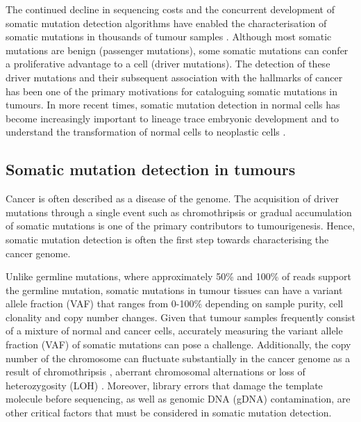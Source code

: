 The continued decline in sequencing costs and the concurrent development of somatic mutation detection algorithms have enabled the characterisation of somatic mutations in thousands of tumour samples \cite{Weinstein2013-ko, ICGCTCGA_Pan-Cancer_Analysis_of_Whole_Genomes_Consortium2020-ts}. Although most somatic mutations are benign (passenger mutations), some somatic mutations can confer a proliferative advantage to a cell (driver mutations). The detection of these driver mutations and their subsequent association with the hallmarks of cancer \cite{Hanahan2000-dp, Hanahan2011-zr} has been one of the primary motivations for cataloguing somatic mutations in tumours. In more recent times, somatic mutation detection in normal cells has become increasingly important to lineage trace embryonic development \cite{Behjati2014-gb} and to understand the transformation of normal cells to neoplastic cells \cite{Martincorena2015-io}. 

\subsection{Somatic mutation detection in tumours}
\label{sec:somatic_mutation_detection_in_tumours}

Cancer is often described as a disease of the genome. The acquisition of driver mutations through a single event such as chromothripsis \cite{Stephens2011-gj} or gradual accumulation of somatic mutations \cite{Doll1954-of, Knudson1971-fg} is one of the primary contributors to tumourigenesis. Hence, somatic mutation detection is often the first step towards characterising the cancer genome. 

Unlike germline mutations, where approximately 50\% and 100\% of reads support the germline mutation, somatic mutations in tumour tissues can have a variant allele fraction (VAF) that ranges from 0-100\% depending on sample purity, cell clonality and copy number changes. Given that tumour samples frequently consist of a mixture of normal and cancer cells, accurately measuring the variant allele fraction (VAF) of somatic mutations can pose a challenge. Additionally, the copy number of the chromosome can fluctuate substantially in the cancer genome as a result of chromothripsis \cite{Stephens2011-gj}, aberrant chromosomal alternations \cite{Albertson2003-lr, Frohling2008-uc} or loss of heterozygosity (LOH) \cite{Lasko1991-wq}. Moreover, library errors that damage the template molecule before sequencing, as well as genomic DNA (gDNA) contamination, are other critical factors that must be considered in somatic mutation detection.


